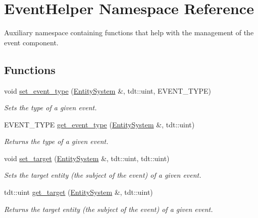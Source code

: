 \hypertarget{namespace_event_helper}{}\section{Event\+Helper Namespace Reference}
\label{namespace_event_helper}


Auxiliary namespace containing functions that help with the management of the event component.  


\subsection*{Functions}
\begin{DoxyCompactItemize}
\item 
void \hyperlink{namespace_event_helper_a912f5fb6cc992ae9d3762293d3558376}{set\+\_\+event\+\_\+type} (\hyperlink{class_entity_system}{Entity\+System} \&, tdt\+::uint, E\+V\+E\+N\+T\+\_\+\+T\+Y\+PE)
\begin{DoxyCompactList}\small\item\em Sets the type of a given event. \end{DoxyCompactList}\item 
E\+V\+E\+N\+T\+\_\+\+T\+Y\+PE \hyperlink{namespace_event_helper_a153e8f8a54c128f13b5f6f91f5891f02}{get\+\_\+event\+\_\+type} (\hyperlink{class_entity_system}{Entity\+System} \&, tdt\+::uint)
\begin{DoxyCompactList}\small\item\em Returns the type of a given event. \end{DoxyCompactList}\item 
void \hyperlink{namespace_event_helper_a5fdeb9fe6309782e080f12681a4d217a}{set\+\_\+target} (\hyperlink{class_entity_system}{Entity\+System} \&, tdt\+::uint, tdt\+::uint)
\begin{DoxyCompactList}\small\item\em Sets the target entity (the subject of the event) of a given event. \end{DoxyCompactList}\item 
tdt\+::uint \hyperlink{namespace_event_helper_a278f5fdd8d44b5828d63c5b44bc59237}{get\+\_\+target} (\hyperlink{class_entity_system}{Entity\+System} \&, tdt\+::uint)
\begin{DoxyCompactList}\small\item\em Returns the target entity (the subject of the event) of a given event. \end{DoxyCompactList}\item 

\end{DoxyCompactItemize}
